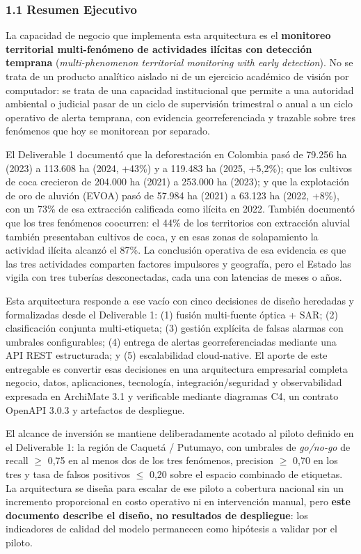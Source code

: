 \documentclass{article}
\begin{document}
\subsubsection{1.1 Resumen Ejecutivo}

La capacidad de negocio que implementa esta arquitectura es el \textbf{monitoreo territorial multi-fenómeno de actividades ilícitas con detección temprana} (\emph{multi-phenomenon territorial monitoring with early detection}). No se trata de un producto analítico aislado ni de un ejercicio académico de visión por computador: se trata de una capacidad institucional que permite a una autoridad ambiental o judicial pasar de un ciclo de supervisión trimestral o anual a un ciclo operativo de alerta temprana, con evidencia georreferenciada y trazable sobre tres fenómenos que hoy se monitorean por separado.

El Deliverable 1 documentó que la deforestación en Colombia pasó de 79.256 ha (2023) a 113.608 ha (2024, +43\%) y a 119.483 ha (2025, +5,2\%); que los cultivos de coca crecieron de 204.000 ha (2021) a 253.000 ha (2023); y que la explotación de oro de aluvión (EVOA) pasó de 57.984 ha (2021) a 63.123 ha (2022, +8\%), con un 73\% de esa extracción calificada como ilícita en 2022. También documentó que los tres fenómenos coocurren: el 44\% de los territorios con extracción aluvial también presentaban cultivos de coca, y en esas zonas de solapamiento la actividad ilícita alcanzó el 87\%. La conclusión operativa de esa evidencia es que las tres actividades comparten factores impulsores y geografía, pero el Estado las vigila con tres tuberías desconectadas, cada una con latencias de meses o años.

Esta arquitectura responde a ese vacío con cinco decisiones de diseño heredadas y formalizadas desde el Deliverable 1: (1) fusión multi-fuente óptica + SAR; (2) clasificación conjunta multi-etiqueta; (3) gestión explícita de falsas alarmas con umbrales configurables; (4) entrega de alertas georreferenciadas mediante una API REST estructurada; y (5) escalabilidad cloud-native. El aporte de este entregable es convertir esas decisiones en una arquitectura empresarial completa \textemdash{}negocio, datos, aplicaciones, tecnología, integración/seguridad y observabilidad\textemdash{} expresada en ArchiMate 3.1 y verificable mediante diagramas C4, un contrato OpenAPI 3.0.3 y artefactos de despliegue.

El alcance de inversión se mantiene deliberadamente acotado al piloto definido en el Deliverable 1: la región de Caquetá / Putumayo, con umbrales de \emph{go/no-go} de recall \ensuremath{\geq} 0,75 en al menos dos de los tres fenómenos, precision \ensuremath{\geq} 0,70 en los tres y tasa de falsos positivos \ensuremath{\leq} 0,20 sobre el espacio combinado de etiquetas. La arquitectura se diseña para escalar de ese piloto a cobertura nacional sin un incremento proporcional en costo operativo ni en intervención manual, pero \textbf{este documento describe el diseño, no resultados de despliegue}: los indicadores de calidad del modelo permanecen como hipótesis a validar por el piloto.
\end{document}

